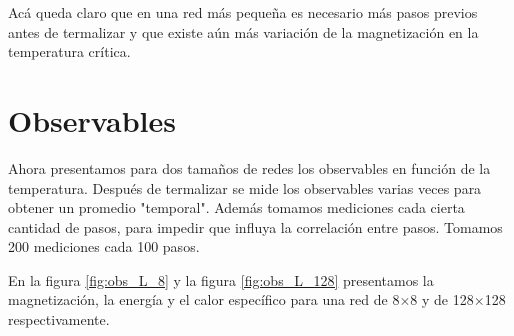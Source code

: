 \documentclass[12pt,a4paper]{article}
\begin{document}
Acá queda claro que en una red más pequeña es necesario más pasos previos antes de termalizar y que existe aún más variación de la magnetización en la temperatura crítica.

\section{Observables}
Ahora presentamos para dos tamaños de redes los observables en función de la temperatura. Después de termalizar se mide los observables varias veces para obtener un promedio "temporal". Además tomamos mediciones cada cierta cantidad de pasos, para impedir que influya la correlación entre pasos. Tomamos 200 mediciones cada 100 pasos.

En la figura  \ref{fig:obs_L_8}   y la figura \ref{fig:obs_L_128} presentamos la magnetización, la energía y el calor específico para una red de 8$\times$8 y de  128$\times$128 respectivamente.
\end{document}
